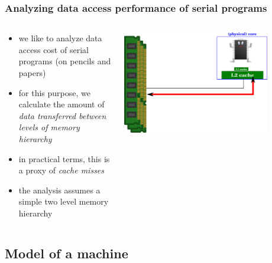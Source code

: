 \documentclass[12pt,dvipdfmx]{beamer}
\newcommand{\ao}[1]{{\color{blue}#1}}
\begin{document}
\begin{frame}
\frametitle{Analyzing data access performance of serial programs}
\begin{columns}
\begin{column}{0.6\textwidth}
\begin{itemize}
\item<1-> we like to analyze data access cost of
  serial programs (on pencils and papers)

\item<2-> for this purpose, we calculate the amount of
  \ao{\em data transferred between levels of
    memory hierarchy}

\item<3-> in practical terms, this is a proxy of
  \ao{\em cache misses}

\item<4-> the analysis assumes a simple two level
  memory hierarchy
\end{itemize}
\end{column}

\begin{column}{0.4\textwidth}
\begin{center}
\includegraphics[width=0.8\textwidth]{out/pdf/svg/analysis_motivation.pdf}
\end{center}
\end{column}  
\end{columns}
\end{frame}

\subsection{Model of a machine}
\end{document}
